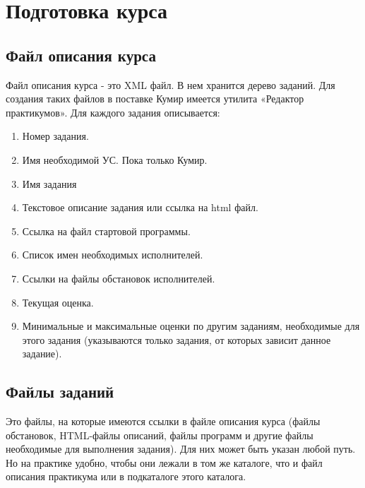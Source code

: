 \section {Подготовка курса } \label {newk}
\subsection {Файл описания курса}
Файл описания курса  - это XML файл. В нем хранится  дерево заданий. Для создания таких файлов в поставке Кумир имеется утилита «Редактор практикумов». Для каждого задания описывается:
\begin{enumerate}
\item	Номер задания.
\item	Имя необходимой УС. Пока только Кумир.
\item	Имя задания
\item	Текстовое описание задания или ссылка на html файл.
\item	Ссылка на файл стартовой программы.
\item	Список имен необходимых исполнителей.
\item	Ссылки на файлы обстановок исполнителей.
\item	Текущая оценка.
\item	Минимальные и максимальные оценки по другим заданиям, необходимые для этого задания (указываются только задания, от которых зависит данное задание).

\end{enumerate}
\subsection {Файлы заданий}
Это файлы, на которые имеются ссылки в файле описания курса (файлы обстановок, HTML-файлы описаний, файлы программ и другие файлы необходимые для выполнения задания).  Для них может быть указан любой путь. Но на практике удобно, чтобы они лежали в том же каталоге, что и файл описания практикума или в подкаталоге этого каталога.

